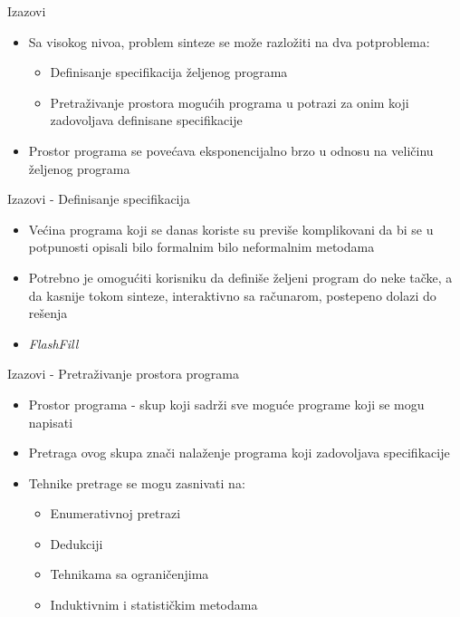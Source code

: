 

\begin{frame}{Izazovi}
    \begin{itemize}
        \item Sa visokog nivoa, problem sinteze se može razložiti na dva potproblema:
            \begin{itemize}
                \item Definisanje specifikacija željenog programa
                \item Pretraživanje prostora mogućih programa u potrazi za onim koji zadovoljava definisane specifikacije
            \end{itemize}
        \item Prostor programa se povećava eksponencijalno brzo u odnosu na veličinu željenog programa
    \end{itemize}
\end{frame}


\begin{frame}{Izazovi - Definisanje specifikacija}
    \begin{itemize}
        \item Većina programa koji se danas koriste su previše komplikovani da bi se u potpunosti opisali bilo formalnim bilo neformalnim metodama
        \item Potrebno je omogućiti korisniku da definiše željeni program do neke tačke, a da kasnije tokom sinteze, interaktivno sa računarom, postepeno dolazi do rešenja
        \item \emph{FlashFill}
    \end{itemize}
\end{frame}

\begin{frame}{Izazovi - Pretraživanje prostora programa}
    \begin{itemize}
        \item Prostor programa - skup koji sadrži sve moguće programe koji se mogu napisati
        \item Pretraga ovog skupa znači nalaženje programa koji zadovoljava specifikacije
        \item Tehnike pretrage se mogu zasnivati na:
            \begin{itemize}
                \item Enumerativnoj pretrazi
                \item Dedukciji
                \item Tehnikama sa ograničenjima
                \item Induktivnim i statističkim metodama
            \end{itemize}
    \end{itemize}
\end{frame}

